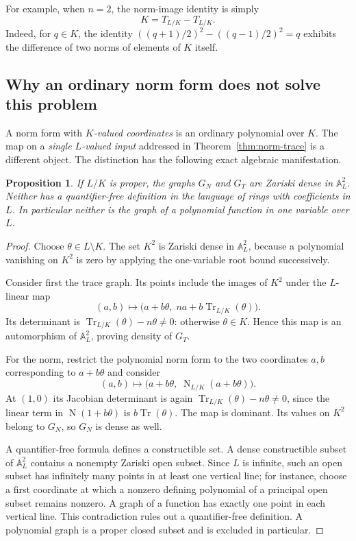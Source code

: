 \documentclass[11pt,a4paper]{article}
\newtheorem{proposition}[theorem]{Proposition}
\theoremstyle{definition}
\newcommand{\Tr}{\operatorname{Tr}}
\newcommand{\Nm}{\operatorname{N}}
\newcommand{\A}{\mathbb A}
\begin{document}
For example, when $n=2$, the norm-image identity is simply
\[
                         K=T_{L/K}-T_{L/K}.
\]
Indeed, for $q\in K$, the identity
$((q+1)/2)^2-((q-1)/2)^2=q$ exhibits the difference of two norms
of elements of $K$ itself.

\subsection{Why an ordinary norm form does not solve this problem}

A norm form with \emph{$K$-valued coordinates} is an ordinary
polynomial over $K$. The map on a \emph{single $L$-valued input}
addressed in Theorem~\ref{thm:norm-trace} is a different object.
The distinction has the following exact algebraic manifestation.

\begin{proposition}\label{prop:dense}
If $L/K$ is proper, the graphs $G_N$ and $G_T$ are Zariski dense
in $\A^2_L$. Neither has a quantifier-free definition in the
language of rings with coefficients in $L$. In particular neither
is the graph of a polynomial function in one variable over $L$.
\end{proposition}
\begin{proof}
Choose $\theta\in L\setminus K$. The set $K^2$ is Zariski dense
in $\A^2_L$, because a polynomial vanishing on $K^2$ is zero by
applying the one-variable root bound successively.

Consider first the trace graph. Its points include the images of
$K^2$ under the $L$-linear map
\[
    (a,b)\longmapsto
        \bigl(a+b\theta,\;na+b\Tr_{L/K}(\theta)\bigr).
\]
Its determinant is $\Tr_{L/K}(\theta)-n\theta\ne0$:
otherwise $\theta\in K$. Hence this map is an automorphism of
$\A^2_L$, proving density of $G_T$.

For the norm, restrict the polynomial norm form to the two
coordinates $a,b$ corresponding to $a+b\theta$ and consider
\[
        (a,b)\longmapsto
          \bigl(a+b\theta,\;\Nm_{L/K}(a+b\theta)\bigr).
\]
At $(1,0)$ its Jacobian determinant is again
$\Tr_{L/K}(\theta)-n\theta\ne0$, since the linear term in
$\Nm(1+b\theta)$ is $b\Tr(\theta)$. The map is dominant.
Its values on $K^2$ belong to $G_N$, so $G_N$ is dense as well.

A quantifier-free formula defines a constructible set. A dense
constructible subset of $\A^2_L$ contains a nonempty Zariski
open subset. Since $L$ is infinite, such an open subset has
infinitely many points in at least one vertical line; for instance,
choose a first coordinate at which a nonzero defining polynomial
of a principal open subset remains nonzero. A graph of a function
has exactly one point in each vertical line. This contradiction
rules out a quantifier-free definition. A polynomial graph is a
proper closed subset and is excluded in particular.
\end{proof}
\end{document}

